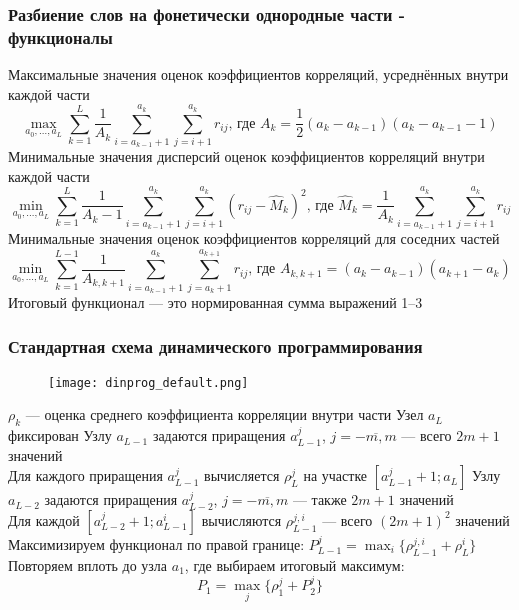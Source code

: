 
\begin{frame}
\frametitle{\small Разбиение слов на фонетически однородные части - функционалы}
\footnotesize
\vfill
{} {\footnotesize Максимальные значения оценок коэффициентов корреляций, усреднённых внутри каждой части}
$$
\max_{a_0, \dots, a_L} \sum_{k=1}^{L} \frac{1}{A_k} \sum^{a_k}_{i=a_{k-1}+1} \sum^{a_k}_{j=i+1} r_{ij}
\text{, где } A_k = \frac{1}{2} (a_k - a_{k-1})(a_k - a_{k-1} - 1)
$$
\vfill
{} {\footnotesize Минимальные значения дисперсий оценок коэффициентов корреляций внутри каждой части}
$$
\min_{a_0, \dots, a_L} \sum_{k=1}^{L} \frac{1}{A_k-1} \sum^{a_k}_{i=a_{k-1}+1} \sum^{a_k}_{j=i+1} (r_{ij} - \widehat{M}_k)^2
\text{, где } \widehat{M}_k = \frac{1}{A_k} \sum^{a_k}_{i=a_{k-1}+1} \sum^{a_k}_{j=i+1} r_{ij}
$$
\vfill
{} {\footnotesize Минимальные значения оценок коэффициентов корреляций для соседних частей}
$$
\min_{a_0, \dots, a_L} \sum_{k=1}^{L-1} \frac{1}{A_{k,k+1}} \sum^{a_k}_{i=a_{k-1}+1} \sum^{a_{k+1}}_{j=a_k+1} r_{ij}
\text{, где } A_{k,k+1} = (a_k - a_{k-1})(a_{k+1} - a_k)
$$
\vfill
Итоговый функционал --- это нормированная сумма выражений 1--3
\vfill
\end{frame}

\begin{frame}
\frametitle{\normalsize Стандартная схема динамического программирования}
\footnotesize
\vfill
\begin{figure}[h]
	\texttt{[image: dinprog\_default.png]}
\end{figure}
\vfill
$\rho_{k}$ --- оценка среднего коэффициента корреляции внутри части
\bigbreak
Узел $a_L$ фиксирован
\bigbreak
Узлу $a_{L-1}$ задаются приращения $a_{L-1}^j$, $j = \overline{-m, m}$ --- всего $2m+1$ значений \\
Для каждого приращения $a_{L-1}^j$ вычисляется $\rho_L^j$ на участке $[a_{L-1}^j + 1; a_L]$
\bigbreak
Узлу $a_{L-2}$ задаются приращения $a_{L-2}^j$, $j = \overline{-m, m}$ --- также $2m+1$ значений \\
Для каждой $[a_{L-2}^j + 1; a_{L-1}^i]$ вычисляются $\rho_{L-1}^{j, i}$ --- всего $(2m + 1)^2$ значений \\
Максимизируем функционал по правой границе: $P_{L-1}^j = \max_{i} \{\rho_{L-1}^{j, i} + \rho_L^i \}$
\bigbreak
Повторяем вплоть до узла $a_1$, где выбираем итоговый максимум:
$$
P_1 = \max_{j} \{\rho_1^j + P_2^j \}
$$
\vfill
\end{frame}


